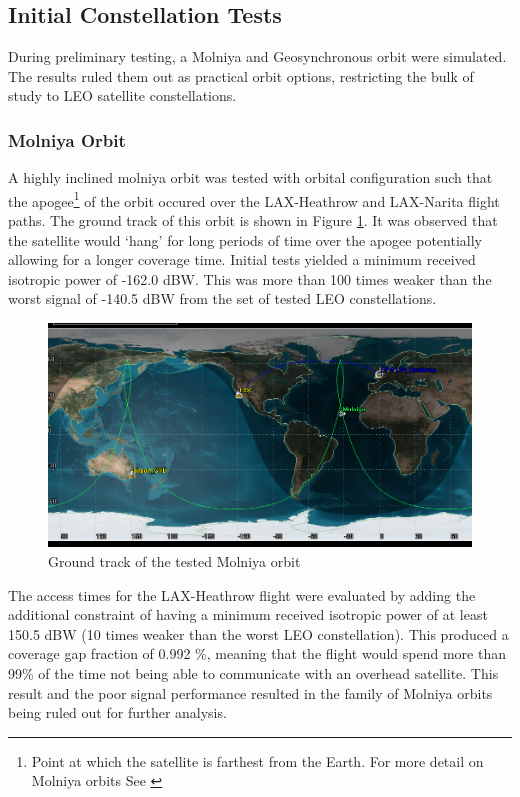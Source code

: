 \subsection{Initial Constellation Tests} \label{sec:initial_constel}
During preliminary testing, a Molniya and Geosynchronous orbit were simulated. The results ruled them out as practical orbit options, restricting the bulk of study to LEO satellite constellations.
\subsubsection{Molniya Orbit}
A highly inclined molniya orbit was tested with orbital configuration such that the apogee\footnote{Point at which the satellite is farthest from the Earth. For more detail on Molniya orbits See \cite{wertz1999space}} of the orbit occured over the LAX-Heathrow and LAX-Narita flight paths. The ground track of this orbit is shown in Figure \ref{fig:molniya}. It was observed that the satellite would `hang' for long periods of time over the apogee potentially allowing for a longer coverage time. Initial tests yielded a minimum received isotropic power of -162.0 dBW. This was more than 100 times weaker than the worst signal of -140.5 dBW from the set of tested LEO constellations. 

\begin{figure}[H]
	\centering
	\includegraphics[scale = 0.50]{Pictures/molniya.png}
	
	\caption{Ground track of the tested Molniya orbit}
	\label{fig:molniya}
\end{figure} 

The access times for the LAX-Heathrow flight were evaluated by adding the additional constraint of having a minimum received isotropic power of at least 150.5 dBW (10 times weaker than the worst LEO constellation). This produced a coverage gap fraction of 0.992 \%, meaning that the flight would spend more than 99\% of the time not being able to communicate with an overhead satellite. This result and the poor signal performance resulted in the family of Molniya orbits being ruled out for further analysis.


